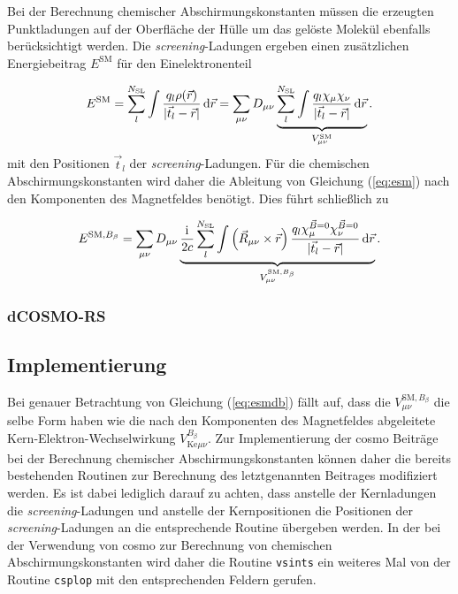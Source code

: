 Bei der Berechnung chemischer Abschirmungskonstanten müssen die erzeugten Punktladungen auf der Oberfläche der Hülle um das gelöste Molekül ebenfalls berücksichtigt werden. Die \textit{screening}-Ladungen ergeben einen zusätzlichen Energiebeitrag $E^{\textrm{SM}}$ für den Einelektronenteil\supercite{cammi1999nuclear}

	\begin{equation}\label{eq:esm}
	E^{\textrm{SM}}=\sum_{l}^{N_{\textrm{SL}}}\int\frac{q_l\rho(\vec{r})}{\vert\vec{t}_l-\vec{r}\vert}\mathop{}\!\mathrm{d}\vec{r}=\sum_{\mu\nu}D_{\mu\nu}\underbrace{\sum_l^{N_{\textrm{SL}}}\int\frac{q_l\chi_\mu\chi_\nu}{\vert\vec{t}_l-\vec{r}\vert}\mathop{}\!\mathrm{d}\vec{r}}_{V_{\mu\nu}^{\textrm{SM}}}.
	\end{equation}
mit den Positionen $\vec{t}_l$ der \textit{screening}-Ladungen. Für die chemischen Abschirmungskonstanten wird daher die Ableitung von Gleichung (\ref{eq:esm}) nach den Komponenten des Magnetfeldes benötigt. Dies führt schließlich zu

	\begin{equation}\label{eq:esmdb}
	E^{\textrm{SM},B_\beta}=\sum_{\mu\nu}D_{\mu\nu}\underbrace{\frac{\mathrm{i}\mkern1mu}{2c}\sum_l^{N_{\textrm{SL}}}\int\left(\vec{R}_{\mu\nu}\times\vec{r}\right)\frac{q_l\chi_\mu^{\vec{B}=0}\chi_\nu^{\vec{B}=0}}{\vert\vec{t}_l-\vec{r}\vert}\mathop{}\!\mathrm{d}\vec{r}}_{V_{\mu\nu}^{\textrm{SM},B_\beta}}.
	\end{equation}
	\subsubsection{dCOSMO-RS}
	\subsection{Implementierung}
	Bei genauer Betrachtung von Gleichung (\ref{eq:esmdb}) fällt auf, dass die $V_{\mu\nu}^{\textrm{SM},B_\beta}$ die selbe Form haben wie die nach den Komponenten des Magnetfeldes abgeleitete Kern-Elektron-Wechselwirkung $V_{\textrm{Ke}\mu\nu}^{B_\beta}$. Zur Implementierung der \ac{cosmo} Beiträge bei der Berechnung chemischer Abschirmungskonstanten können daher die bereits bestehenden Routinen zur Berechnung des letztgenannten Beitrages modifiziert werden. Es ist dabei lediglich darauf zu achten, dass anstelle der Kernladungen die \textit{screening}-Ladungen und anstelle der Kernpositionen die Positionen der \textit{screening}-Ladungen an die entsprechende Routine übergeben werden. In der bei der Verwendung von \ac{cosmo} zur Berechnung von chemischen Abschirmungskonstanten wird daher die Routine \texttt{vsints} ein weiteres Mal von der Routine \texttt{csplop} mit den entsprechenden Feldern gerufen. 
	
